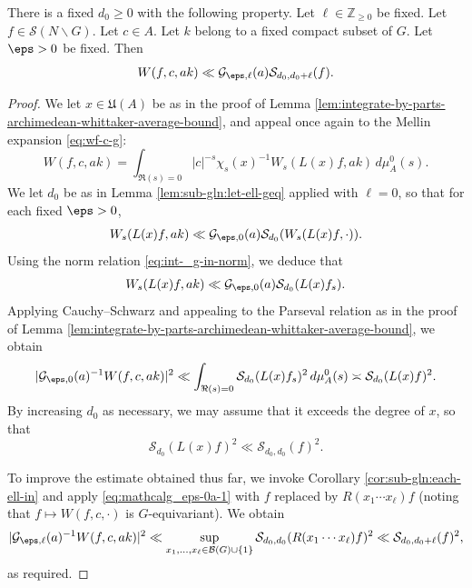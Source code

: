 \begin{lemma}\label{lem:scratch-research:each-fixed-m}
  There is a fixed $d_0 \geq 0$ with the following property.  Let $\ell \in \mathbb{Z}_{\geq 0}$ be fixed.  Let $f \in \mathcal{S}(N \backslash G)$.  Let $c \in A$.  Let $k$ belong to a fixed compact subset of $G$.  Let $\eps > 0$ be fixed.  Then
  \begin{equation*}
    W(f,c,a k) \ll \mathcal{G}_{\eps,\ell}(a) \mathcal{S}_{d_0, d_0 + \ell}(f).
  \end{equation*}
\end{lemma}
\begin{proof}
  We let $x \in \mathfrak{U}(A)$ be as in the proof of Lemma \ref{lem:integrate-by-parts-archimedean-whittaker-average-bound}, and appeal once again to the Mellin expansion \eqref{eq:wf-c-g}:
  \begin{equation*}
    W(f,c,a k) =
    \int_{\Re(s) = 0}
    |c|^{-s} \chi_s(x)^{-1} W_s(L(x) f,a k) \, d \mu_A^0(s).
  \end{equation*}
  We let $d_0$ be as in Lemma \ref{lem:sub-gln:let-ell-geq} applied with $\ell = 0$, so that for each fixed $\eps > 0$,
  \begin{equation*}
    W_s(L(x) f, a k) \ll \mathcal{G}_{\eps,0}(a) \mathcal{S}_{d_0}(W_s(L(x) f, \cdot)).
  \end{equation*}
  Using the norm relation \eqref{eq:int-_g-in-norm}, we deduce that
  \begin{equation*}
    W_s(L(x) f, a k) \ll \mathcal{G}_{\eps,0}(a) \mathcal{S}_{d_0}(L(x) f_s).
  \end{equation*}
  Applying Cauchy--Schwarz and appealing to the Parseval relation as in the proof of Lemma \ref{lem:integrate-by-parts-archimedean-whittaker-average-bound}, we obtain
  \begin{equation}\label{eq:mathcalg_eps-0a-1}
    |\mathcal{G}_{\eps,0}(a)^{-1} W(f,c,a k)|^2 \ll
    \int_{\Re(s) = 0}
    \mathcal{S}_{d_0}(L(x) f_s)^2 \, d \mu_A^0(s)
    \asymp
    \mathcal{S}_{d_0}(L(x) f)^2.
  \end{equation}
  By increasing $d_0$ as necessary, we may assume that it exceeds the degree of $x$, so that
  \begin{equation*}
    \mathcal{S}_{d_0}(L(x) f)^2 \ll \mathcal{S}_{d_0,d_0}(f)^2.
  \end{equation*}

  To improve the estimate obtained thus far, we invoke Corollary \ref{cor:sub-gln:each-ell-in} and apply \eqref{eq:mathcalg_eps-0a-1} with $f$ replaced by $R(x_1 \dotsb x_{\ell}) f$ (noting that $f \mapsto W(f,c,\cdot)$ is $G$-equivariant).  We obtain
  \begin{equation*}
    |\mathcal{G}_{\eps,\ell}(a)^{-1} W(f,c,a k)|^2 \ll
    \sup_{x_1,\dotsc,x_\ell \in \mathcal{B}(G) \cup \{1\}}
    \mathcal{S}_{d_0,d_0}(R(x_1 \dotsb x_{\ell}) f)^2
    \ll
    \mathcal{S}_{d_0, d_0 + \ell}(f)^2,
  \end{equation*}
  as required.
\end{proof}


